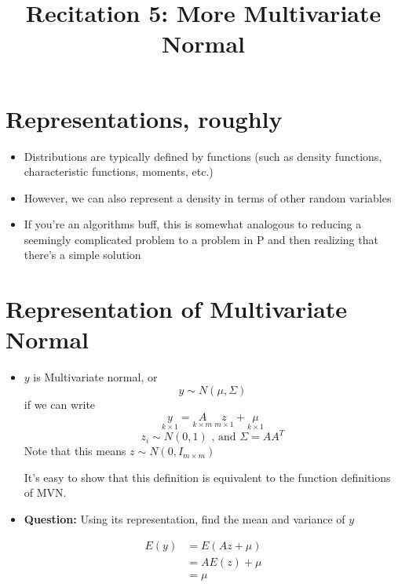 \documentclass[12pt]{article}
\title{Recitation 5: More Multivariate Normal}
\date{}
\author{}
\begin{document}
\maketitle	

\vspace{-30pt}

\section{Representations, roughly}
\begin{itemize}
	\item Distributions are typically defined by functions (such as density functions, characteristic functions, moments, etc.)
	\item However, we can also represent a density in terms of other random variables\footnotemark {}
	\item If you're an algorithms buff, this is somewhat analogous to reducing a seemingly complicated problem to a problem in P and then realizing that there's a simple solution
\end{itemize}

\section{Representation of Multivariate Normal}
\begin{itemize}
	\item $y$ is Multivariate normal, or 
	$$y \sim N(\mu, \Sigma)$$
	if we can write 
	\begin{equation*}
	\underset{k\times 1}{y} =  \underset{k\times m}{A} \  
	\underset{m\times 1}{z} + \underset{k\times 1}{\mu}
	\end{equation*}
	$$z_i \sim N(0,1) \text{ ,\ \ and \ \ } \Sigma = AA^T$$
	Note that this means $z \sim N(0,I_{m \times m})$
	
	It's easy to show that this definition is equivalent to the function definitions of MVN.
	
	\item \textbf{Question:} Using its representation, find the mean and variance of $y$
\end{itemize}

\begin{align*}
	E(y) &= E(Az + \mu) \\
		 &= AE(z) + \mu \\
		 &= \mu
\end{align*}
\end{document}
